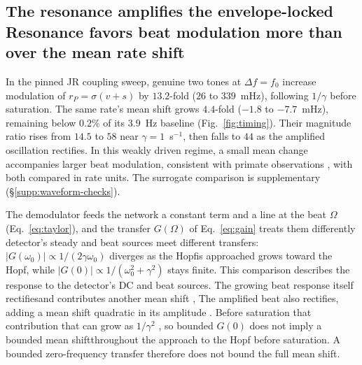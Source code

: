 \documentclass[11pt,a4paper]{article}
\newcommand{\Sig}{\sigma}
\providecommand{\DIFaddtex}[1]{{\protect\color{blue} \sf #1}} %
\providecommand{\DIFdeltex}[1]{{\protect\color{red} \scriptsize #1}} %
\providecommand{\DIFaddbegin}{} %
\providecommand{\DIFaddend}{} %
\providecommand{\DIFdelbegin}{} %
\providecommand{\DIFdelend}{} %
\providecommand{\DIFadd}[1]{\texorpdfstring{\DIFaddtex{#1}}{#1}} %
\providecommand{\DIFdel}[1]{\texorpdfstring{\DIFdeltex{#1}}{}} %
\begin{document}
\subsection{\DIFdelbegin \DIFdel{The resonance amplifies the envelope-locked }\DIFdelend \DIFaddbegin \DIFadd{Resonance favors beat }\DIFaddend modulation \DIFdelbegin \DIFdel{more than }\DIFdelend \DIFaddbegin \DIFadd{over }\DIFaddend the mean \DIFdelbegin \DIFdel{rate}\DIFdelend \DIFaddbegin \DIFadd{shift}\DIFaddend }\label{sec:timing}
In the pinned JR coupling sweep, genuine two tones at $\Delta f=f_0$
increase modulation of $r_P=\Sig(v+s)$ by $13.2$-fold ($26$ to $339$~mHz),
following $1/\gamma$ before saturation. The same rate's mean shift grows
$4.4$-fold ($-1.8$ to $-7.7$~mHz), remaining below $0.2\%$ of its
$3.9$~Hz baseline (Fig.~\ref{fig:timing}). Their magnitude ratio rises
from $14.5$ to $58$ near $\gamma=1$~s$^{-1}$, then falls to $44$ as
the amplified oscillation rectifies. In this weakly driven regime, a small
mean change accompanies larger beat modulation, consistent with primate observations
\cite{vieira2024}, with both compared in rate units. The surrogate
comparison is supplementary (\S\ref{supp:waveform-checks}).

The \DIFdelbegin \DIFdel{demodulator feeds the network a constant term and a line at the beat $\Omega$
(Eq.~\eqref{eq:taylor}), and the transfer $G(\Omega)$ of Eq.~\eqref{eq:gain} treats them
differently}\DIFdelend \DIFaddbegin \DIFadd{detector's steady and beat sources meet different transfers}\DIFaddend :
$|G(\omega_0)|\propto1/(2\gamma\omega_0)$ \DIFdelbegin \DIFdel{diverges as the Hopfis approached}\DIFdelend \DIFaddbegin \DIFadd{grows toward the Hopf}\DIFaddend , while
$|G(0)|\propto1/(\omega_0^2+\gamma^2)$ stays finite. \DIFdelbegin \DIFdel{This comparison describes
the response to the detector's DC and beat sources. The growing beat
response
itself rectifiesand contributes another mean shift , }\DIFdelend \DIFaddbegin \DIFadd{The amplified beat
also rectifies, adding a mean shift }\DIFaddend quadratic in its amplitude \DIFdelbegin \DIFdel{.
Before saturation that contribution }\DIFdelend \DIFaddbegin \DIFadd{that }\DIFaddend can
grow as $1/\gamma^2$ \DIFdelbegin \DIFdel{, so bounded $G(0)$
does not imply a bounded mean shiftthroughout the approach to the Hopf}\DIFdelend \DIFaddbegin \DIFadd{before saturation. A bounded zero-frequency transfer
therefore does not bound the full mean shift}\DIFaddend .
\end{document}
